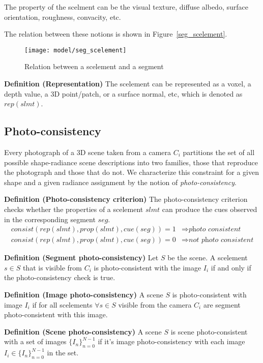 The property of the scelment can be the visual texture, diffuse albedo, surface orientation, roughness, convacity, etc.

The relation between these notions is shown in Figure~\ref{seg_scelement}.
\begin{figure}[h]
\centering
\texttt{[image: model/seg\_scelement]}
\caption{Relation between a scelement and a segment}
\end{figure}

\textbf{Definition (Representation)} The scelement can be represented as a voxel, a depth value, a 3D point/patch, or a surface normal, etc, which is denoted as $rep(slmt)$.

\subsection{Photo-consistency}
Every photograph of a 3D scene taken from a camera $C_i$ partitions the set of all possible shape-radiance scene descriptions into two families, those that reproduce the photograph and those that do not. We characterize this constraint for a given shape and a given radiance assignment by the notion of \textit{photo-consistency}.

\textbf{Definition (Photo-consistency criterion)} The photo-consistency criterion checks whether the properties of a scelement $slmt$ can produce the cues observed in the corresponding segment $seg$.
\begin{align*}
consist(rep(slmt), prop(slmt), cue(seg)) = 1 &\Rightarrow \textit{photo consistent}\\
consist(rep(slmt), prop(slmt), cue(seg)) = 0 &\Rightarrow \textit{not photo consistent}
\end{align*}

\textbf{Definition (Segment photo-consistency)} Let $S$ be the scene. A scelement $s\in S$ that is visible from $C_i$ is photo-consistent with the image $I_i$ if and only if the photo-consistency check is true.

\textbf{Definition (Image photo-consistency)} A scene $S$ is photo-consistent with image $I_i$ if for all scelements $\forall s\in S$ visible from the camera $C_i$ are segment photo-consistent with this image.

\textbf{Definition (Scene photo-consistency)} A scene $S$ is scene photo-consistent with a set of images $\{I_n\}_{n=0}^{N-1}$ if it's image photo-consistency with each image $I_i\in \{I_n\}_{n=0}^{N-1}$ in the set.

